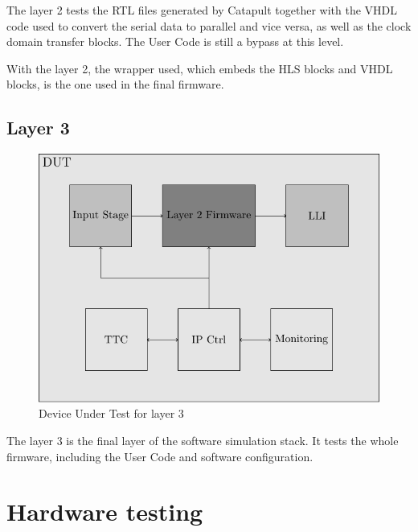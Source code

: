 The layer 2 tests the RTL files generated by Catapult together with the VHDL code used to convert the serial data to parallel and vice versa, as well as the clock domain transfer blocks. The User Code is still a bypass at this level. 

With the layer 2, the wrapper used, which embeds the HLS blocks and VHDL blocks, is the one used in the final firmware.

\subsection{Layer 3}

\begin{figure}[htb]
    \centering
    \includegraphics[width=1\textwidth]{diagrams/l3}
    \caption{Device Under Test for layer 3}
    \label{fig:dut-l3}
\end{figure}

The layer 3 is the final layer of the software simulation stack. It tests the whole firmware, including the User Code and software configuration.

\section{Hardware testing}
